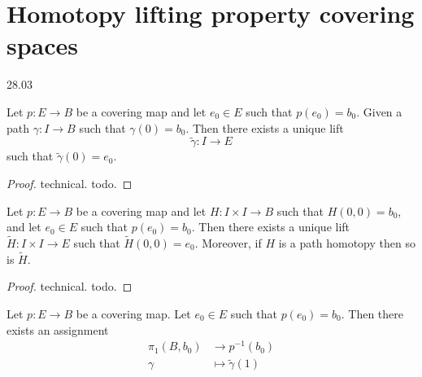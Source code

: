 \section{Homotopy lifting property covering spaces}
28.03

\begin{theorem}
    Let \( p: E \to B \)
    be a covering map and let
    \( e_0 \in E \) such that \( p(e_0) = b_0 \).
    Given a path \( \gamma: I \to B \)
    such that \( \gamma(0) = b_0 \).
    Then there exists a unique lift
    \[
      \tilde{\gamma}: I \to E
    \]
    such that \( \tilde{\gamma}(0) = e_0 \).
\end{theorem}

\begin{proof}
    technical. todo.
\end{proof}

\begin{theorem}
  \label{thm:hom_lift}
   Let \( p: E \to B \)  be a covering map
   and let \( H: I \times I \to B \)
   such that \( H(0, 0) = b_0 \), and
   let \( e_0 \in E \) such that
   \( p(e_0) = b_0 \).
   Then there exists a unique lift
   \( \tilde{H}: I \times I \to E \)
   such that \( \tilde{H}(0, 0) = e_0 \).
   Moreover, if \( H \) is a path homotopy
   then so is \( \tilde{H} \).
\end{theorem}

\begin{proof}
    technical. todo.
\end{proof}

\begin{proposition}
    Let \( p: E \to B \) be a covering map.
    Let \( e_0 \in E \) such that \( p(e_0) = b_0 \).
    Then there exists an assignment
    \begin{align}
      \pi_1(B, b_0) &\longrightarrow  {p}^{-1} (b_0) \\
      \gamma &\longmapsto \tilde{\gamma} (1)
    \end{align}
\end{proposition}

